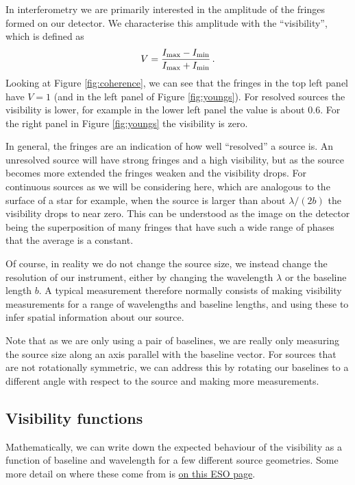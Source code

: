 \documentclass[11pt]{article}
\begin{document}
In interferometry we are primarily interested in the amplitude of the fringes formed on our detector. We characterise this amplitude with the ``visibility'', which is defined as
\begin{equation}
    V = \frac{I_{\rm max} - I_{\rm min}}{I_{\rm max} + I_{\rm min}} \, .
\end{equation}
Looking at Figure \ref{fig:coherence}, we can see that the fringes in the top left panel have $V=1$ (and in the left panel of Figure \ref{fig:youngs}). For resolved sources the visibility is lower, for example in the lower left panel the value is about 0.6. For the right panel in Figure \ref{fig:youngs} the visibility is zero.

In general, the fringes are an indication of how well ``resolved'' a source is. An unresolved source will have strong fringes and a high visibility, but as the source becomes more extended the fringes weaken and the visibility drops. For continuous sources as we will be considering here, which are analogous to the surface of a star for example, when the source is larger than about $\lambda/(2b)$ the visibility drops to near zero. This can be understood as the image on the detector being the superposition of many fringes that have such a wide range of phases that the average is a constant.

Of course, in reality we do not change the source size, we instead change the resolution of our instrument, either by changing the wavelength $\lambda$ or the baseline length $b$. A typical measurement therefore normally consists of making visibility measurements for a range of wavelengths and baseline lengths, and using these to infer spatial information about our source.

Note that as we are only using a pair of baselines, we are really only measuring the source size along an axis parallel with the baseline vector. For sources that are not rotationally symmetric, we can address this by rotating our baselines to a different angle with respect to the source and making more measurements.

\subsection{Visibility functions}

Mathematically, we can write down the expected behaviour of the visibility as a function of baseline and wavelength for a few different source geometries. Some more detail on where these come from is \href{https://www.eso.org/sci/facilities/paranal/telescopes/vlti/tuto/tutorial_interferometry.html}{on this ESO page}.
\end{document}

